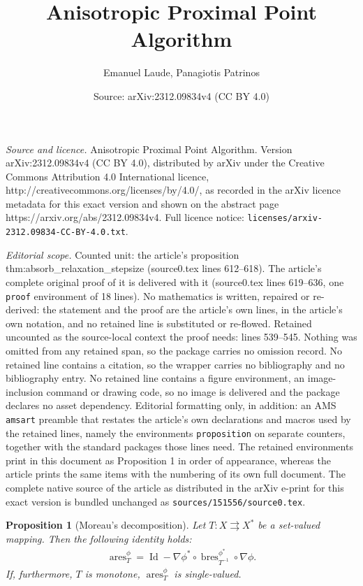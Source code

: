 \documentclass[10pt,a4paper]{amsart}
\title{Anisotropic Proximal Point Algorithm}
\author{Emanuel Laude, Panagiotis Patrinos}
\date{Source: arXiv:2312.09834v4 (CC BY 4.0)}
\newtheorem{proposition}{Proposition}
\newcommand{\ares}[2]{\operatorname{ares}_{#2}^{#1}}
\newcommand{\bres}[2]{\operatorname{bres}_{#2}^{#1}}
\DeclareMathOperator{\id}{Id}
\begin{document}
\maketitle

\noindent\emph{Source and licence.} Anisotropic Proximal Point Algorithm. Version arXiv:2312.09834v4 (CC BY 4.0), distributed by arXiv under the Creative Commons Attribution 4.0 International licence, http://creativecommons.org/licenses/by/4.0/, as recorded in the arXiv licence metadata for this exact version and shown on the abstract page https://arxiv.org/abs/2312.09834v4. Full licence notice: \texttt{licenses/arxiv-2312.09834-CC-BY-4.0.txt}.\par\smallskip

\noindent\textit{Editorial scope.} Counted unit: the article's proposition thm:absorb\_relaxation\_stepsize (source0.tex lines 612--618). The article's complete original proof of it is delivered with it (source0.tex lines 619--636, one \texttt{proof} environment of 18 lines). No mathematics is written, repaired or re-derived: the statement and the proof are the article's own lines, in the article's own notation, and no retained line is substituted or re-flowed.  Retained uncounted as the source-local context the proof needs: lines 539--545.  Nothing was omitted from any retained span, so the package carries no omission record.  No retained line contains a citation, so the wrapper carries no bibliography and no bibliography entry.  No retained line contains a figure environment, an image-inclusion command or drawing code, so no image is delivered and the package declares no asset dependency.  Editorial formatting only, in addition: an AMS \texttt{amsart} preamble that restates the article's own declarations and macros used by the retained lines, namely the environments \texttt{proposition} on separate counters, together with the standard packages those lines need.  The retained environments print in this document as Proposition 1 in order of appearance, whereas the article prints the same items with the numbering of its own full document.  The complete native source of the article as distributed in the arXiv e-print for this exact version is bundled unchanged as \texttt{sources/151556/source0.tex}.
\begin{proposition}[Moreau's decomposition] \label{thm:moreau_decomposition}
Let $T: X \rightrightarrows X^*$ be a set-valued mapping. Then the following identity holds:
\begin{align}
\ares{\phi}{T}  = \id - \nabla \phi^* \circ \bres{\phi^*}{T^{-1}} \circ \nabla \phi.
\end{align}
If, furthermore, $T$ is monotone, $\ares{\phi}{T}$ is single-valued.
\end{proposition}
\end{document}
